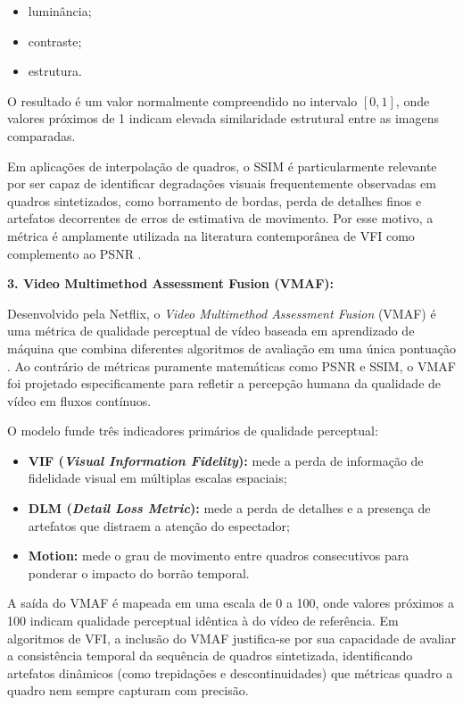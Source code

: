 \documentclass[
    12pt,                %
    openright,           %
    oneside,             %
    a4paper,             %
    english,             %
    brazil               %
]{abntex2}
\begin{document}
\begin{itemize}
    \item luminância;
    \item contraste;
    \item estrutura.
\end{itemize}

O resultado é um valor normalmente compreendido no intervalo $[0,1]$, onde valores próximos de 1 indicam elevada similaridade estrutural entre as imagens comparadas.

Em aplicações de interpolação de quadros, o SSIM é particularmente relevante por ser capaz de identificar degradações visuais frequentemente observadas em quadros sintetizados, como borramento de bordas, perda de detalhes finos e artefatos decorrentes de erros de estimativa de movimento. Por esse motivo, a métrica é amplamente utilizada na literatura contemporânea de VFI como complemento ao PSNR \cite{Niklaus2017,Niklaus2021}.

\vspace{0.3cm}

\textbf{3. Video Multimethod Assessment Fusion (VMAF):}

Desenvolvido pela Netflix, o \textit{Video Multimethod Assessment Fusion} (VMAF) é uma métrica de qualidade perceptual de vídeo baseada em aprendizado de máquina que combina diferentes algoritmos de avaliação em uma única pontuação \cite{Li2016VMAF}. Ao contrário de métricas puramente matemáticas como PSNR e SSIM, o VMAF foi projetado especificamente para refletir a percepção humana da qualidade de vídeo em fluxos contínuos.

O modelo funde três indicadores primários de qualidade perceptual:

\begin{itemize}
    \item \textbf{VIF (\textit{Visual Information Fidelity}):} mede a perda de informação de fidelidade visual em múltiplas escalas espaciais;
    \item \textbf{DLM (\textit{Detail Loss Metric}):} mede a perda de detalhes e a presença de artefatos que distraem a atenção do espectador;
    \item \textbf{Motion:} mede o grau de movimento entre quadros consecutivos para ponderar o impacto do borrão temporal.
\end{itemize}

A saída do VMAF é mapeada em uma escala de 0 a 100, onde valores próximos a 100 indicam qualidade perceptual idêntica à do vídeo de referência. Em algoritmos de VFI, a inclusão do VMAF justifica-se por sua capacidade de avaliar a consistência temporal da sequência de quadros sintetizada, identificando artefatos dinâmicos (como trepidações e descontinuidades) que métricas quadro a quadro nem sempre capturam com precisão.
\end{document}
